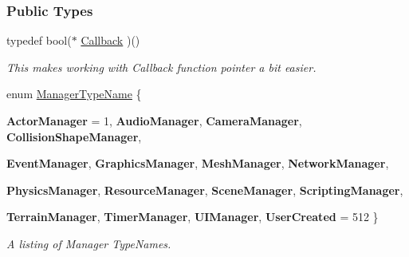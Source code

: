 \subsubsection*{Public Types}
\begin{DoxyCompactItemize}
\item 
\hypertarget{classMezzanine_1_1ManagerBase_ab23a9aa27c4e3cb58d902a149d3c6de2}{
typedef bool($\ast$ \hyperlink{classMezzanine_1_1ManagerBase_ab23a9aa27c4e3cb58d902a149d3c6de2}{Callback} )()}
\label{classMezzanine_1_1ManagerBase_ab23a9aa27c4e3cb58d902a149d3c6de2}

\begin{DoxyCompactList}\small\item\em This makes working with Callback function pointer a bit easier. \item\end{DoxyCompactList}\item 
enum \hyperlink{classMezzanine_1_1ManagerBase_a08cecf5169cad3e82be81a3a159b0b6e}{ManagerTypeName} \{ \par
{\bfseries ActorManager} =  1, 
{\bfseries AudioManager}, 
{\bfseries CameraManager}, 
{\bfseries CollisionShapeManager}, 
\par
{\bfseries EventManager}, 
{\bfseries GraphicsManager}, 
{\bfseries MeshManager}, 
{\bfseries NetworkManager}, 
\par
{\bfseries PhysicsManager}, 
{\bfseries ResourceManager}, 
{\bfseries SceneManager}, 
{\bfseries ScriptingManager}, 
\par
{\bfseries TerrainManager}, 
{\bfseries TimerManager}, 
{\bfseries UIManager}, 
{\bfseries UserCreated} =  512
 \}
\begin{DoxyCompactList}\small\item\em A listing of Manager TypeNames. \item\end{DoxyCompactList}\end{DoxyCompactItemize}

